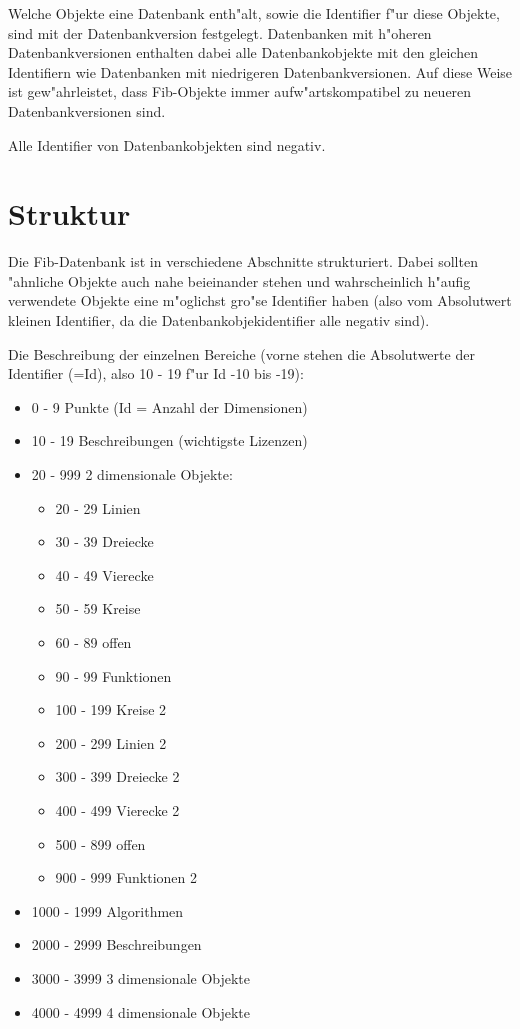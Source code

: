 Welche Objekte eine Datenbank enth"alt, sowie die Identifier f"ur diese Objekte, sind mit der Datenbankversion festgelegt. Datenbanken mit h"oheren Datenbankversionen enthalten dabei alle Datenbankobjekte mit den gleichen Identifiern wie Datenbanken mit niedrigeren Datenbankversionen. Auf diese Weise ist gew"ahrleistet, dass Fib-Objekte immer aufw"artskompatibel zu neueren Datenbankversionen sind.

Alle Identifier von Datenbankobjekten sind negativ.


\section{Struktur}

Die Fib-Datenbank ist in verschiedene Abschnitte strukturiert.
Dabei sollten "ahnliche Objekte auch nahe beieinander stehen und wahrscheinlich h"aufig verwendete Objekte eine m"oglichst gro"se Identifier haben (also vom Absolutwert kleinen Identifier, da die Datenbankobjekidentifier alle negativ sind).

\bigskip\noindent
Die Beschreibung der einzelnen Bereiche (vorne stehen die Absolutwerte der Identifier (=Id), also 10 - 19 f"ur Id -10 bis -19):
\begin{itemize}
 \item 0 - 9 Punkte (Id = Anzahl der Dimensionen)
 \item 10 - 19 Beschreibungen (wichtigste Lizenzen)
 \item 20 - 999 2 dimensionale Objekte:
 \begin{itemize}
  \item 20 - 29 Linien
  \item 30 - 39 Dreiecke
  \item 40 - 49 Vierecke
  \item 50 - 59 Kreise
  \item 60 - 89 offen
  \item 90 - 99 Funktionen
  \item 100 - 199 Kreise 2
  \item 200 - 299 Linien 2
  \item 300 - 399 Dreiecke 2
  \item 400 - 499 Vierecke 2
  \item 500 - 899 offen
  \item 900 - 999 Funktionen 2
 \end{itemize}
 \item 1000 - 1999 Algorithmen
 \item 2000 - 2999 Beschreibungen
 \item 3000 - 3999 3 dimensionale Objekte
 \item 4000 - 4999 4 dimensionale Objekte

\end{itemize}


